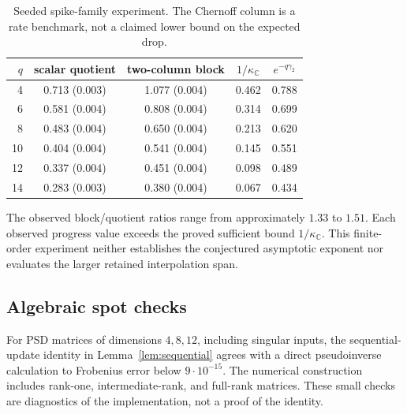 \documentclass[11pt,a4paper]{article}
\theoremstyle{definition}\newtheorem{definition}[theorem]{Definition}
\theoremstyle{remark}\newtheorem{remark}[theorem]{Remark}
\numberwithin{equation}{section}
\newcommand{\C}{\mathbb C}
\begin{document}
\begin{table}[ht]
\centering
\begin{tabular}{@{}rcccc@{}}
\toprule
\(q\) & scalar quotient & two-column block & \(1/\kappa_{\C}\) & \(e^{-q\gamma_2}\)\\
\midrule
4 & 0.713 (0.003) & 1.077 (0.004) & 0.462 & 0.788\\
6 & 0.581 (0.004) & 0.808 (0.004) & 0.314 & 0.699\\
8 & 0.483 (0.004) & 0.650 (0.004) & 0.213 & 0.620\\
10 & 0.404 (0.004) & 0.541 (0.004) & 0.145 & 0.551\\
12 & 0.337 (0.004) & 0.451 (0.004) & 0.098 & 0.489\\
14 & 0.283 (0.003) & 0.380 (0.004) & 0.067 & 0.434\\
\bottomrule
\end{tabular}
\caption{Seeded spike-family experiment. The Chernoff column is a rate
benchmark, not a claimed lower bound on the expected drop.}
\label{tab:spike}
\end{table}
The observed block/quotient ratios range from approximately \(1.33\)
to \(1.51\). Each observed progress value exceeds the proved sufficient
bound \(1/\kappa_{\C}\). This finite-order experiment neither establishes
the conjectured asymptotic exponent nor evaluates the larger retained
interpolation span.

\subsection{Algebraic spot checks}
For PSD matrices of dimensions \(4,8,12\), including singular inputs,
the sequential-update identity in Lemma~\ref{lem:sequential} agrees with
a direct pseudoinverse calculation to Frobenius error below
\(9\cdot10^{-15}\). The numerical construction includes rank-one,
intermediate-rank, and full-rank matrices. These small checks are
diagnostics of the implementation, not a proof of the identity.

\end{document}
